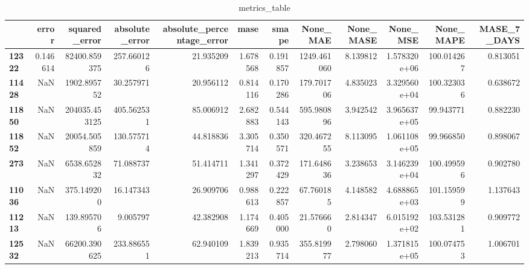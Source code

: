 \begin{table}[h]
\centering
\caption{metrics_table}
\label{table:Test wheather cnnaelstm and lstm used same parametesr for the experiment}
\begin{tabular}{lrrrrrrrrrrr}
\toprule
{} &     error &  squared\_error &  absolute\_error &  absolute\_percentage\_error &      mase &     smape &     None\_MAE &  None\_MASE &      None\_MSE &   None\_MAPE &  MASE\_7\_DAYS \\
\midrule
\textbf{12322} &  0.146614 &   82400.859375 &      257.660126 &                  21.935209 &  1.678568 &  0.191857 &  1249.461060 &   8.139812 &  1.578320e+06 &  100.014267 &     0.813051 \\
\textbf{11428} &       NaN &    1902.895752 &       30.257971 &                  20.956112 &  0.814116 &  0.170286 &   179.701706 &   4.835023 &  3.329560e+04 &  100.323036 &     0.638672 \\
\textbf{11850} &       NaN &  204035.453125 &      405.562531 &                  85.006912 &  2.682883 &  0.544143 &   595.980896 &   3.942542 &  3.965637e+05 &   99.943771 &     0.882230 \\
\textbf{11852} &       NaN &   20054.505859 &      130.575714 &                  44.818836 &  3.305714 &  0.350571 &   320.467255 &   8.113095 &  1.061108e+05 &   99.966850 &     0.898067 \\
\textbf{273  } &       NaN &    6538.652832 &       71.088737 &                  51.414711 &  1.341297 &  0.372429 &   171.648636 &   3.238653 &  3.146239e+04 &  100.499596 &     0.902780 \\
\textbf{11036} &       NaN &     375.149200 &       16.147343 &                  26.909706 &  0.988613 &  0.222857 &    67.760185 &   4.148582 &  4.688865e+03 &  101.159599 &     1.137643 \\
\textbf{11213} &       NaN &     139.895706 &        9.005797 &                  42.382908 &  1.174669 &  0.405000 &    21.576660 &   2.814347 &  6.015192e+02 &  103.531281 &     0.909772 \\
\textbf{12532} &       NaN &   66200.390625 &      233.886551 &                  62.940109 &  1.839213 &  0.935714 &   355.819977 &   2.798060 &  1.371815e+05 &  100.074753 &     1.006701 \\
\bottomrule
\end{tabular}
\end{table}
